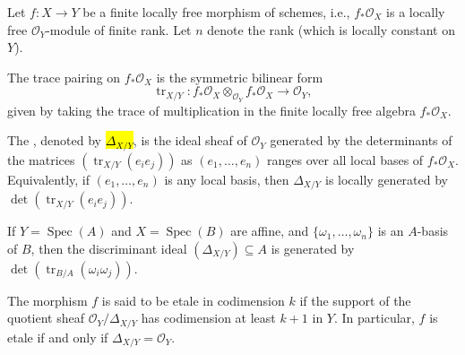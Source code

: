 \begin{definition} \label{definition:discriminant_of_a_finite_flat_morphism_of_schemes}
Let $f : X \to Y$ be a finite locally free morphism of schemes, i.e., $f_*\mathcal{O}_X$ is a locally free $\mathcal{O}_Y$-module of finite rank. Let $n$ denote the rank (which is locally constant on $Y$).

The trace pairing on $f_*\mathcal{O}_X$ is the symmetric bilinear form
$$\operatorname{tr}_{X/Y} : f_*\mathcal{O}_X \otimes_{\mathcal{O}_Y} f_*\mathcal{O}_X \to \mathcal{O}_Y,$$
given by taking the trace of multiplication in the finite locally free algebra $f_*\mathcal{O}_X$.

The , denoted by \hl{$\Delta_{X/Y}$}, is the ideal sheaf of $\mathcal{O}_Y$ generated by the determinants of the matrices $(\operatorname{tr}_{X/Y}(e_i e_j))$ as $(e_1, \ldots, e_n)$ ranges over all local bases of $f_*\mathcal{O}_X$. Equivalently, if $(e_1, \ldots, e_n)$ is any local basis, then $\Delta_{X/Y}$ is locally generated by $\det(\operatorname{tr}_{X/Y}(e_i e_j))$.

If $Y = \operatorname{Spec}(A)$ and $X = \operatorname{Spec}(B)$ are affine, and $\{\omega_1, \ldots, \omega_n\}$ is an $A$-basis of $B$, then the discriminant ideal $(\Delta_{X/Y}) \subseteq A$ is generated by $\det(\operatorname{tr}_{B/A}(\omega_i \omega_j))$.

The morphism $f$ is said to be etale in codimension $k$ if the support of the quotient sheaf $\mathcal{O}_Y / \Delta_{X/Y}$ has codimension at least $k+1$ in $Y$. In particular, $f$ is etale if and only if $\Delta_{X/Y} = \mathcal{O}_Y$.
\end{definition}
